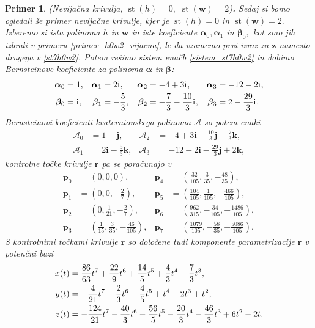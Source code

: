 \documentclass[12pt,a4paper,twoside]{article}
\newcommand{\iu}{\mathrm{i}\mkern1mu} %
\theoremstyle{definition} %
\theoremstyle{plain} %
\theoremstyle{primerstyle}
\newtheorem{primer}[definicija]{Primer}
\numberwithin{equation}{section}  %
\newcommand{\pV}{\mathbf{p}}
\newcommand{\rV}{\mathbf{r}}
\newcommand{\iV}{\mathbf{i}}
\newcommand{\jV}{\mathbf{j}}
\newcommand{\kV}{\mathbf{k}}
\newcommand{\wV}{\mathbf{w}}
\newcommand{\zV}{\mathbf{z}}
\newcommand{\AQ}{\mathcal{A}}
\newcommand{\balpha}{\boldsymbol \alpha}
\newcommand{\bbeta}{\boldsymbol \beta}
\DeclareMathOperator{\st}{st}
\begin{document}
\begin{primer}
	\label{primer_h0w2_nevijacna}
	\textnormal{ }(Nevijačna krivulja, $\st(h)=0,$ $\st(\wV)=2$)\textbf{.}
	Sedaj si bomo ogledali še primer nevijačne krivulje, kjer je $\st(h)=0$ in $\st(\wV)=2.$ Izberemo si ista polinoma $h$ in $\wV$ in iste koeficiente $\balpha_0,\balpha_1$ in $\bbeta_0,$ kot smo jih izbrali v primeru \ref{primer_h0w2_vijacna}, le da vzamemo prvi izraz za $\zV$ namesto drugega v \eqref{st7h0w2}. Potem rešimo sistem enačb \eqref{sistem_st7h0w2} in dobimo Bernsteinove koeficiente za polinoma $\balpha$ in $\bbeta$:
	\begin{align*}
		\balpha_0&=1,&\balpha_1&=2\iu,&\balpha_2&=-4+3\iu,&\balpha_3&=-12-2\iu,\\
		\bbeta_0&=\iu,&\bbeta_1&=-\frac{5}{3},&\bbeta_2&=-\frac{7}{3}-\frac{10}{3}\iu,&\bbeta_3&=2-\frac{29}{3}\iu.
	\end{align*}
	Bernsteinovi koeficienti kvaternionskega polinoma $\AQ$ so potem enaki
	\begin{align*}
		\AQ_0&=1+\jV,&\AQ_2&=-4+3\iV-\frac{10}{3}\jV-\frac{7}{3}\kV,\\
		\AQ_1&=2\iV-\frac{5}{3}\kV,&\AQ_3&=-12-2\iV-\frac{29}{3}\jV+2\kV,
	\end{align*}
	kontrolne točke krivulje $\rV$ pa se poračunajo v
	\begin{align*}
		\pV_0&=(0,0,0),&\pV_4&=\left(\frac{32}{105},\frac{3}{35},-\frac{48}{35}\right),\\
		\pV_1&=\left(0,0,-\frac{2}{7}\right),&\pV_5&=\left(\frac{104}{105},\frac{1}{105},-\frac{466}{105}\right),\\
		\pV_2&=\left(0,\frac{1}{21},-\frac{2}{7}\right),&\pV_6&=\left(\frac{962}{315},-\frac{34}{105},-\frac{1486}{105}\right),\\
		\pV_3&=\left(\frac{1}{15},\frac{3}{35},-\frac{46}{105}\right),&\pV_7&=\left(\frac{1079}{105},-\frac{58}{35},-\frac{5086}{105}\right).
	\end{align*}
	S kontrolnimi točkami krivulje $\rV$ so določene tudi komponente parametrizacije $\rV$ v potenčni bazi
	\begin{align}
		x(t)&=\frac{86}{63}t^7+\frac{22}{9}t^6+\frac{14}{5}t^5+\frac{4}{3}t^4+\frac{7}{3}t^3,\notag\\
		y(t)&=-\frac{4}{21}t^7-\frac{2}{3}t^6-\frac{4}{5}t^5+t^4-2t^3+t^2,\label{primer_h0w2_nevijacna_krivulja}\\
		z(t)&=-\frac{124}{21}t^7-\frac{40}{3}t^6-\frac{56}{5}t^5-\frac{20}{3}t^4-\frac{46}{3}t^3+6t^2-2t.\notag
	\end{align}

\end{primer}
\end{document}
